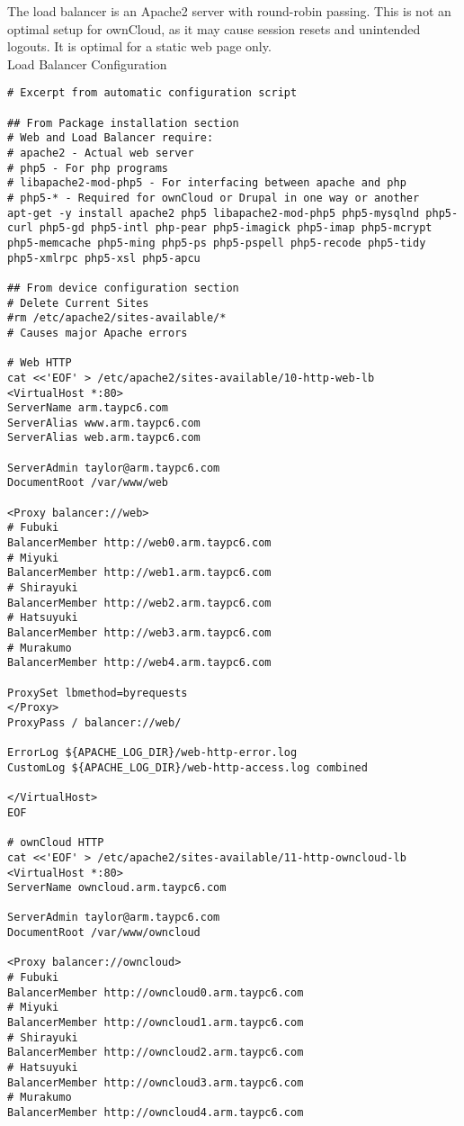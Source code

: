 \documentclass[12pt]{spieman}  %
\begin{document}
The load balancer is an Apache2 server with round-robin passing. This is not an optimal setup for ownCloud, as it may cause session resets and unintended logouts. It is optimal for a static web page only.\\

Load Balancer Configuration
\begin{lstlisting}
# Excerpt from automatic configuration script

## From Package installation section
# Web and Load Balancer require:
# apache2 - Actual web server
# php5 - For php programs
# libapache2-mod-php5 - For interfacing between apache and php
# php5-* - Required for ownCloud or Drupal in one way or another
apt-get -y install apache2 php5 libapache2-mod-php5 php5-mysqlnd php5-curl php5-gd php5-intl php-pear php5-imagick php5-imap php5-mcrypt php5-memcache php5-ming php5-ps php5-pspell php5-recode php5-tidy php5-xmlrpc php5-xsl php5-apcu

## From device configuration section
# Delete Current Sites
#rm /etc/apache2/sites-available/*
# Causes major Apache errors

# Web HTTP
cat <<'EOF' > /etc/apache2/sites-available/10-http-web-lb
<VirtualHost *:80>
ServerName arm.taypc6.com
ServerAlias www.arm.taypc6.com
ServerAlias web.arm.taypc6.com

ServerAdmin taylor@arm.taypc6.com
DocumentRoot /var/www/web

<Proxy balancer://web>
# Fubuki
BalancerMember http://web0.arm.taypc6.com
# Miyuki
BalancerMember http://web1.arm.taypc6.com
# Shirayuki
BalancerMember http://web2.arm.taypc6.com
# Hatsuyuki
BalancerMember http://web3.arm.taypc6.com
# Murakumo
BalancerMember http://web4.arm.taypc6.com

ProxySet lbmethod=byrequests
</Proxy>
ProxyPass / balancer://web/

ErrorLog ${APACHE_LOG_DIR}/web-http-error.log
CustomLog ${APACHE_LOG_DIR}/web-http-access.log combined

</VirtualHost>
EOF

# ownCloud HTTP
cat <<'EOF' > /etc/apache2/sites-available/11-http-owncloud-lb
<VirtualHost *:80>
ServerName owncloud.arm.taypc6.com

ServerAdmin taylor@arm.taypc6.com
DocumentRoot /var/www/owncloud

<Proxy balancer://owncloud>
# Fubuki
BalancerMember http://owncloud0.arm.taypc6.com
# Miyuki
BalancerMember http://owncloud1.arm.taypc6.com
# Shirayuki
BalancerMember http://owncloud2.arm.taypc6.com
# Hatsuyuki
BalancerMember http://owncloud3.arm.taypc6.com
# Murakumo
BalancerMember http://owncloud4.arm.taypc6.com


\end{lstlisting}
\end{document}
